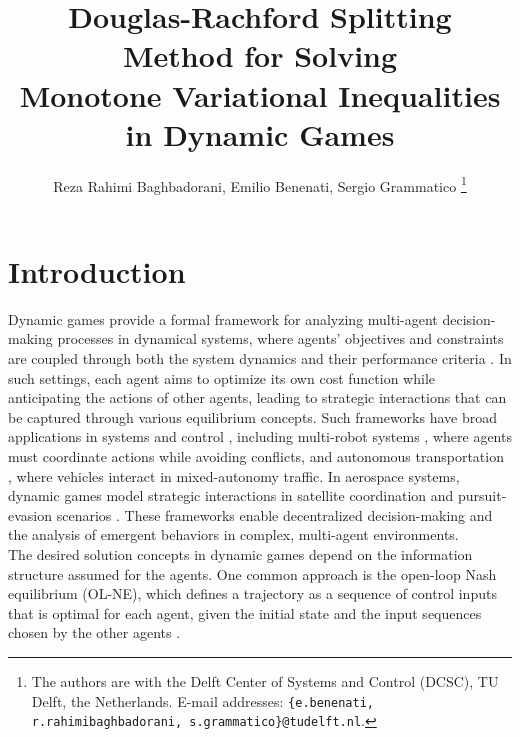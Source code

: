 \documentclass[letterpaper, 10 pt, conference]{ieeeconf}  %
\title{\LARGE \bf
Douglas-Rachford Splitting Method for Solving \\
Monotone Variational Inequalities in Dynamic Games
}
\author{Reza Rahimi Baghbadorani, Emilio Benenati, Sergio Grammatico %
\thanks{The authors are with the Delft Center of Systems and
Control (DCSC), TU Delft, the Netherlands. E-mail addresses:
{\tt\small \{e.benenati, r.rahimibaghbadorani, s.grammatico\}@tudelft.nl}.}%
}
\begin{document}
\maketitle
\thispagestyle{empty}
\pagestyle{empty}


\begin{abstract}


\end{abstract}
\section{Introduction}
Dynamic games provide a formal framework for analyzing multi-agent decision-making processes in dynamical systems, where agents' objectives and constraints are coupled through both the system dynamics and their performance criteria \cite{haurie2012games,suzanne2000dynamic,wang2022cooperative}. In such settings, each agent aims to optimize its own cost function while anticipating the actions of other agents, leading to strategic interactions that can be captured through various equilibrium concepts. Such frameworks have broad applications in systems and control \cite{fele2018framework}, including multi-robot systems \cite{hall2024game}, where agents must coordinate actions while avoiding conflicts, and autonomous transportation \cite{kada2020distributed}, where vehicles interact in mixed-autonomy traffic. In aerospace systems, dynamic games model strategic interactions in satellite coordination and pursuit-evasion scenarios \cite{musavi2017unmanned,li2020distributed}. These frameworks enable decentralized decision-making and the analysis of emergent behaviors in complex, multi-agent environments.\\
The desired solution concepts in dynamic games depend on the information structure assumed for the agents. One common approach is the open-loop Nash equilibrium (OL-NE), which defines a trajectory as a sequence of control inputs that is optimal for each agent, given the initial state and the input sequences chosen by the other agents \cite{monti2024feedback,sassano2021constructive}.
\end{document}
